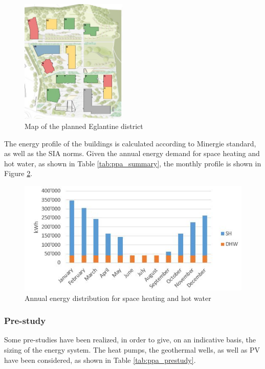 \documentclass{article}
\begin{document}



\begin{figure}[h!]
\centering
\includegraphics[width=0.45\textwidth]{ppa_buildings.JPG}
\caption{Map of the planned Eglantine district}
\label{fig:ppa_buildings}
\end{figure}

The energy profile of the buildings is calculated according to Minergie standard, as well as the SIA norms. Given the annual energy demand for space heating and hot water, as shown in Table \ref{tab:ppa_summary}, the monthly profile is shown in Figure \ref{fig:ppa_energydemand}.

\begin{figure}[h!]
\centering
\includegraphics[width=1\textwidth]{ppa_energydemand.JPG}
\caption{Annual energy distribution for space heating and hot water}
\label{fig:ppa_energydemand}
\end{figure}


\subsubsection{Pre-study}
Some pre-studies have been realized, in order to give, on an indicative basis, the sizing of the energy system. The heat pumps, the geothermal wells, as well as PV have been considered, as shown in Table \ref{tab:ppa_prestudy}.

\end{document}
